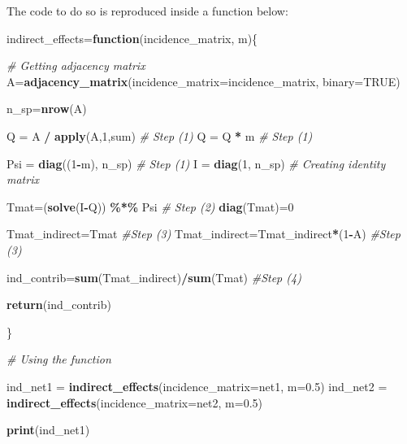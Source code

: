 \documentclass[
]{book}
\newenvironment{Shaded}{\begin{snugshade}}{\end{snugshade}}
\newcommand{\AttributeTok}[1]{\textcolor[rgb]{0.13,0.29,0.53}{#1}}
\newcommand{\CommentTok}[1]{\textcolor[rgb]{0.56,0.35,0.01}{\textit{#1}}}
\newcommand{\ConstantTok}[1]{\textcolor[rgb]{0.56,0.35,0.01}{#1}}
\newcommand{\ControlFlowTok}[1]{\textcolor[rgb]{0.13,0.29,0.53}{\textbf{#1}}}
\newcommand{\DecValTok}[1]{\textcolor[rgb]{0.00,0.00,0.81}{#1}}
\newcommand{\FloatTok}[1]{\textcolor[rgb]{0.00,0.00,0.81}{#1}}
\newcommand{\FunctionTok}[1]{\textcolor[rgb]{0.13,0.29,0.53}{\textbf{#1}}}
\newcommand{\NormalTok}[1]{#1}
\newcommand{\OtherTok}[1]{\textcolor[rgb]{0.56,0.35,0.01}{#1}}
\newcommand{\SpecialCharTok}[1]{\textcolor[rgb]{0.81,0.36,0.00}{\textbf{#1}}}
\begin{document}
The code to do so is reproduced inside a function below:

\begin{Shaded}
\begin{Highlighting}[]
\NormalTok{indirect\_effects}\OtherTok{=}\ControlFlowTok{function}\NormalTok{(incidence\_matrix, m)\{}
  
  \CommentTok{\# Getting adjacency matrix}
\NormalTok{  A}\OtherTok{=}\FunctionTok{adjacency\_matrix}\NormalTok{(}\AttributeTok{incidence\_matrix=}\NormalTok{incidence\_matrix, }\AttributeTok{binary=}\ConstantTok{TRUE}\NormalTok{)}
  
\NormalTok{  n\_sp}\OtherTok{=}\FunctionTok{nrow}\NormalTok{(A)}
  
\NormalTok{  Q }\OtherTok{=}\NormalTok{ A }\SpecialCharTok{/} \FunctionTok{apply}\NormalTok{(A,}\DecValTok{1}\NormalTok{,sum) }\CommentTok{\# Step (1)}
\NormalTok{  Q }\OtherTok{=}\NormalTok{ Q }\SpecialCharTok{*}\NormalTok{ m }\CommentTok{\# Step (1)}
  
\NormalTok{  Psi }\OtherTok{=} \FunctionTok{diag}\NormalTok{((}\DecValTok{1}\SpecialCharTok{{-}}\NormalTok{m), n\_sp) }\CommentTok{\# Step (1)}
\NormalTok{  I }\OtherTok{=} \FunctionTok{diag}\NormalTok{(}\DecValTok{1}\NormalTok{, n\_sp) }\CommentTok{\# Creating identity matrix}
  
\NormalTok{  Tmat}\OtherTok{=}\NormalTok{(}\FunctionTok{solve}\NormalTok{(I}\SpecialCharTok{{-}}\NormalTok{Q)) }\SpecialCharTok{\%*\%}\NormalTok{ Psi }\CommentTok{\# Step (2)}
  \FunctionTok{diag}\NormalTok{(Tmat)}\OtherTok{=}\DecValTok{0}
  
\NormalTok{  Tmat\_indirect}\OtherTok{=}\NormalTok{Tmat }\CommentTok{\#Step (3)}
\NormalTok{  Tmat\_indirect}\OtherTok{=}\NormalTok{Tmat\_indirect}\SpecialCharTok{*}\NormalTok{(}\DecValTok{1}\SpecialCharTok{{-}}\NormalTok{A) }\CommentTok{\#Step (3)}
  
\NormalTok{  ind\_contrib}\OtherTok{=}\FunctionTok{sum}\NormalTok{(Tmat\_indirect)}\SpecialCharTok{/}\FunctionTok{sum}\NormalTok{(Tmat) }\CommentTok{\#Step (4)}
  
  \FunctionTok{return}\NormalTok{(ind\_contrib)}
  
\NormalTok{\}}

\CommentTok{\# Using the function}

\NormalTok{ind\_net1 }\OtherTok{=} \FunctionTok{indirect\_effects}\NormalTok{(}\AttributeTok{incidence\_matrix=}\NormalTok{net1, }\AttributeTok{m=}\FloatTok{0.5}\NormalTok{)}
\NormalTok{ind\_net2 }\OtherTok{=} \FunctionTok{indirect\_effects}\NormalTok{(}\AttributeTok{incidence\_matrix=}\NormalTok{net2, }\AttributeTok{m=}\FloatTok{0.5}\NormalTok{)}

\FunctionTok{print}\NormalTok{(ind\_net1)}
\end{Highlighting}
\end{Shaded}
\end{document}
